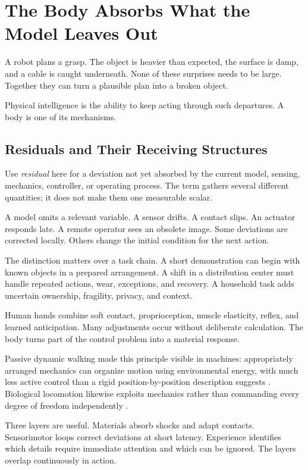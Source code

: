 \section{The Body Absorbs What the Model Leaves Out}

A robot plans a grasp. The object is heavier than expected, the surface is damp, and a cable is caught underneath. None of these surprises needs to be large. Together they can turn a plausible plan into a broken object.

Physical intelligence is the ability to keep acting through such departures. A body is one of its mechanisms.

\subsection{Residuals and Their Receiving Structures}

Use \emph{residual} here for a deviation not yet absorbed by the current model, sensing, mechanics, controller, or operating process. The term gathers several different quantities; it does not make them one measurable scalar.

A model omits a relevant variable. A sensor drifts. A contact slips. An actuator responds late. A remote operator sees an obsolete image. Some deviations are corrected locally. Others change the initial condition for the next action.

The distinction matters over a task chain. A short demonstration can begin with known objects in a prepared arrangement. A shift in a distribution center must handle repeated actions, wear, exceptions, and recovery. A household task adds uncertain ownership, fragility, privacy, and context.

Human hands combine soft contact, proprioception, muscle elasticity, reflex, and learned anticipation. Many adjustments occur without deliberate calculation. The body turns part of the control problem into a material response.

Passive dynamic walking made this principle visible in machines: appropriately arranged mechanics can organize motion using environmental energy, with much less active control than a rigid position-by-position description suggests \cite{mcgeer1990,collins2005}. Biological locomotion likewise exploits mechanics rather than commanding every degree of freedom independently \cite{full1999}.

Three layers are useful. Materials absorb shocks and adapt contacts. Sensorimotor loops correct deviations at short latency. Experience identifies which details require immediate attention and which can be ignored. The layers overlap continuously in action.

